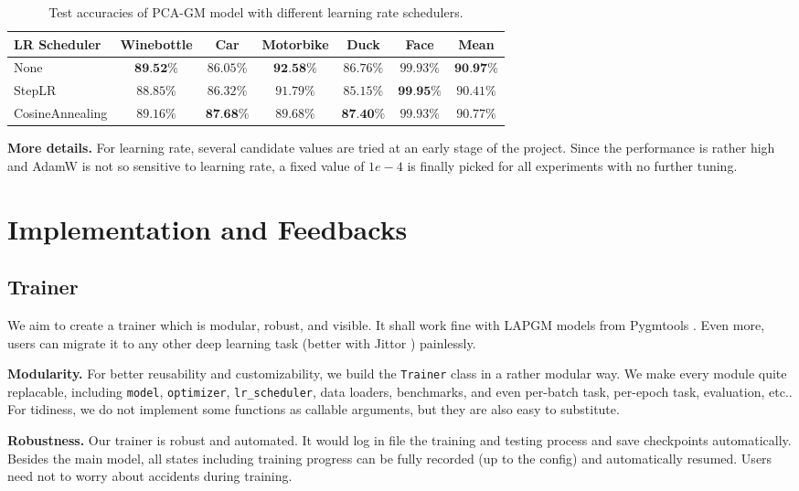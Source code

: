 \documentclass[a4paper]{article}
\begin{document}
\begin{table}[htbp]
    \centering
    \begin{tabular}{lcccccc}
        \toprule
        LR Scheduler& Winebottle& Car& Motorbike& Duck& Face& Mean\\
        \midrule
        None& $\textbf{89.52\%}$& $86.05\%$& $\textbf{92.58\%}$& $86.76\%$& $99.93\%$& $\textbf{90.97\%}$\\
        StepLR& $88.85\%$& $86.32\%$& $91.79\%$& $85.15\%$& $\textbf{99.95\%}$& $90.41\%$\\
        CosineAnnealing& $89.16\%$& $\textbf{87.68\%}$& $89.68\%$& $\textbf{87.40\%}$& $99.93\%$& $90.77\%$\\
        \bottomrule
        
    \end{tabular}
    \caption{Test accuracies of PCA-GM model with different learning rate schedulers.}
    \label{tab:scheduler}
\end{table}

\textbf{More details.}
For learning rate, several candidate values are tried at an early stage of the project. Since the performance is rather high and AdamW is not so sensitive to learning rate, a fixed value of $1e-4$ is finally picked for all experiments with no further tuning.



\section{Implementation and Feedbacks}

\subsection{Trainer}
We aim to create a trainer which is modular, robust, and visible. It shall work fine with LAPGM models from Pygmtools \cite{pygmtools}. Even more, users can migrate it to any other deep learning task (better with Jittor \cite{jittor}) painlessly.

\textbf{Modularity.}
For better reusability and customizability, we build the \texttt{Trainer} class in a rather modular way. We make every module quite replacable, including \texttt{model}, \texttt{optimizer}, \texttt{lr\_scheduler}, data loaders, benchmarks, and even per-batch task, per-epoch task, evaluation, etc.. For tidiness, we do not implement some functions as callable arguments, but they are also easy to substitute.

\textbf{Robustness.}
Our trainer is robust and automated. It would log in file the training and testing process and save checkpoints automatically. Besides the main model, all states including training progress can be fully recorded (up to the config) and automatically resumed. Users need not to worry about accidents during training.
\end{document}
